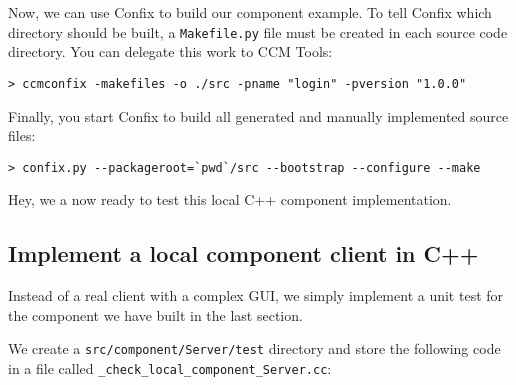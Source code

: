 Now, we can use Confix to build our component example. To tell Confix which
directory should be built, a {\tt Makefile.py} file must be created in each
source code directory.
You can delegate this work to CCM Tools:
\begin{verbatim}
> ccmconfix -makefiles -o ./src -pname "login" -pversion "1.0.0"
\end{verbatim}
 
Finally, you start Confix to build all generated and manually implemented source
files:
\begin{verbatim}
> confix.py --packageroot=`pwd`/src --bootstrap --configure --make 
\end{verbatim}

Hey, we a now ready to test this local C++ component implementation.


\subsection{Implement a local component client in C++}
\label{subsection:ImplementLocalComponentClient}

Instead of a real client with a complex GUI, we simply implement a unit test for
the component we have built in the last section.

\vspace{3mm}
We create a {\tt src/component/Server/test} directory and store the following
code in a file called {\tt \_check\_local\_component\_Server.cc}:
 
